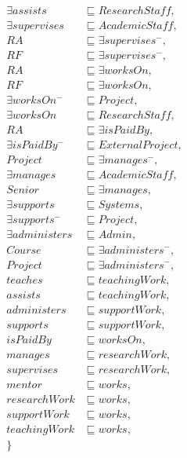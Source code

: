 \documentclass{article}
\begin{document}
\begin{align*}
\exists assists &\sqsubseteq ResearchStaff,\\
% 
\exists supervises &\sqsubseteq AcademicStaff,\\
RA &\sqsubseteq \exists supervises^-,\\
RF &\sqsubseteq \exists supervises^-,\\
%
RA &\sqsubseteq \exists worksOn,\\
RF &\sqsubseteq \exists worksOn,\\
\exists worksOn^- &\sqsubseteq Project,\\
\exists worksOn &\sqsubseteq ResearchStaff,\\
%
RA &\sqsubseteq \exists isPaidBy,\\
\exists isPaidBy^- &\sqsubseteq ExternalProject,\\
%
Project &\sqsubseteq \exists manages^-,\\
\exists manages &\sqsubseteq AcademicStaff,\\
Senior &\sqsubseteq \exists manages,\\
%
\exists supports &\sqsubseteq Systems,\\
\exists supports^- &\sqsubseteq Project,\\
%
\exists administers &\sqsubseteq Admin,\\
Course &\sqsubseteq \exists administers^-,\\
Project &\sqsubseteq \exists administers^-,\\
%
teaches &\sqsubseteq teachingWork,\\
assists &\sqsubseteq teachingWork,\\
administers &\sqsubseteq supportWork,\\
supports &\sqsubseteq supportWork,\\
isPaidBy &\sqsubseteq worksOn,\\
manages &\sqsubseteq researchWork,\\
supervises &\sqsubseteq researchWork,\\
mentor &\sqsubseteq works,\\
researchWork &\sqsubseteq works,\\
supportWork &\sqsubseteq works,\\
teachingWork &\sqsubseteq works,\\
\}
\end{align*}
\end{document}
